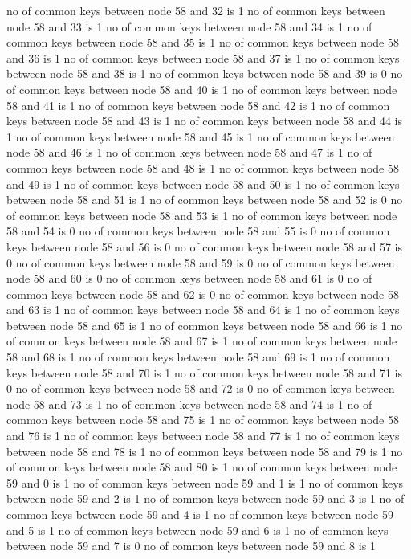 no of common keys between node 58 and 32 is 1
no of common keys between node 58 and 33 is 1
no of common keys between node 58 and 34 is 1
no of common keys between node 58 and 35 is 1
no of common keys between node 58 and 36 is 1
no of common keys between node 58 and 37 is 1
no of common keys between node 58 and 38 is 1
no of common keys between node 58 and 39 is 0
no of common keys between node 58 and 40 is 1
no of common keys between node 58 and 41 is 1
no of common keys between node 58 and 42 is 1
no of common keys between node 58 and 43 is 1
no of common keys between node 58 and 44 is 1
no of common keys between node 58 and 45 is 1
no of common keys between node 58 and 46 is 1
no of common keys between node 58 and 47 is 1
no of common keys between node 58 and 48 is 1
no of common keys between node 58 and 49 is 1
no of common keys between node 58 and 50 is 1
no of common keys between node 58 and 51 is 1
no of common keys between node 58 and 52 is 0
no of common keys between node 58 and 53 is 1
no of common keys between node 58 and 54 is 0
no of common keys between node 58 and 55 is 0
no of common keys between node 58 and 56 is 0
no of common keys between node 58 and 57 is 0
no of common keys between node 58 and 59 is 0
no of common keys between node 58 and 60 is 0
no of common keys between node 58 and 61 is 0
no of common keys between node 58 and 62 is 0
no of common keys between node 58 and 63 is 1
no of common keys between node 58 and 64 is 1
no of common keys between node 58 and 65 is 1
no of common keys between node 58 and 66 is 1
no of common keys between node 58 and 67 is 1
no of common keys between node 58 and 68 is 1
no of common keys between node 58 and 69 is 1
no of common keys between node 58 and 70 is 1
no of common keys between node 58 and 71 is 0
no of common keys between node 58 and 72 is 0
no of common keys between node 58 and 73 is 1
no of common keys between node 58 and 74 is 1
no of common keys between node 58 and 75 is 1
no of common keys between node 58 and 76 is 1
no of common keys between node 58 and 77 is 1
no of common keys between node 58 and 78 is 1
no of common keys between node 58 and 79 is 1
no of common keys between node 58 and 80 is 1
no of common keys between node 59 and 0 is 1
no of common keys between node 59 and 1 is 1
no of common keys between node 59 and 2 is 1
no of common keys between node 59 and 3 is 1
no of common keys between node 59 and 4 is 1
no of common keys between node 59 and 5 is 1
no of common keys between node 59 and 6 is 1
no of common keys between node 59 and 7 is 0
no of common keys between node 59 and 8 is 1

